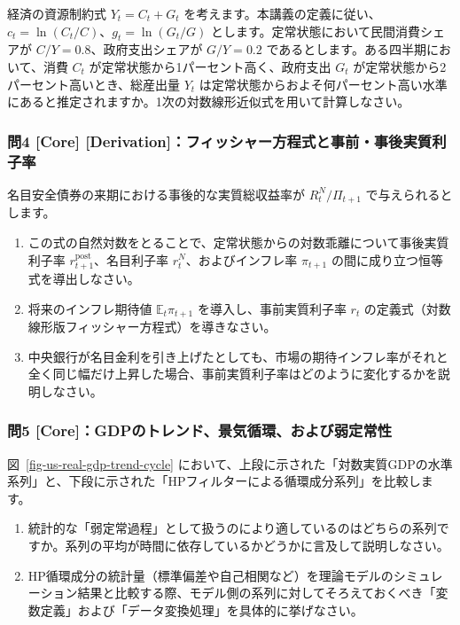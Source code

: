 \documentclass[
  japanese,
  lualatex,
  ja=standard,
  12pt,
  a4paper]{ltjsarticle}
\providecommand{\tightlist}{%
  \setlength{\itemsep}{0pt}\setlength{\parskip}{0pt}}
\begin{document}
経済の資源制約式 \(Y_t=C_t+G_t\)
を考えます。本講義の定義に従い、\(c_t=\ln(C_t/C)\)、\(g_t=\ln(G_t/G)\)
とします。定常状態において民間消費シェアが \(C/Y=0.8\)、政府支出シェアが
\(G/Y=0.2\) であるとします。ある四半期において、消費 \(C_t\)
が定常状態から1パーセント高く、政府支出 \(G_t\)
が定常状態から2パーセント高いとき、総産出量 \(Y_t\)
は定常状態からおよそ何パーセント高い水準にあると推定されますか。1次の対数線形近似式を用いて計算しなさい。

\subsubsection{問4 {[}Core{]}
{[}Derivation{]}：フィッシャー方程式と事前・事後実質利子率}\label{ux554f4-core-derivationux30d5ux30a3ux30c3ux30b7ux30e3ux30fcux65b9ux7a0bux5f0fux3068ux4e8bux524dux4e8bux5f8cux5b9fux8ceaux5229ux5b50ux7387}

名目安全債券の来期における事後的な実質総収益率が \(R_t^N/\Pi_{t+1}\)
で与えられるとします。

\begin{enumerate}
\def\labelenumi{\arabic{enumi}.}
\tightlist
\item
  この式の自然対数をとることで、定常状態からの対数乖離について事後実質利子率
  \(r_{t+1}^{\mathrm{post}}\)、名目利子率 \(r_t^N\)、およびインフレ率
  \(\pi_{t+1}\) の間に成り立つ恒等式を導出しなさい。
\item
  将来のインフレ期待値 \(\mathbb{E}_t\pi_{t+1}\)
  を導入し、事前実質利子率 \(r_t\)
  の定義式（対数線形版フィッシャー方程式）を導きなさい。
\item
  中央銀行が名目金利を引き上げたとしても、市場の期待インフレ率がそれと全く同じ幅だけ上昇した場合、事前実質利子率はどのように変化するかを説明しなさい。
\end{enumerate}


\subsubsection{問5
{[}Core{]}：GDPのトレンド、景気循環、および弱定常性}\label{ux554f5-coregdpux306eux30c8ux30ecux30f3ux30c9ux666fux6c17ux5faaux74b0ux304aux3088ux3073ux5f31ux5b9aux5e38ux6027}

図~\ref{fig-us-real-gdp-trend-cycle}
において、上段に示された「対数実質GDPの水準系列」と、下段に示された「HPフィルターによる循環成分系列」を比較します。

\begin{enumerate}
\def\labelenumi{\arabic{enumi}.}
\tightlist
\item
  統計的な「弱定常過程」として扱うのにより適しているのはどちらの系列ですか。系列の平均が時間に依存しているかどうかに言及して説明しなさい。
\item
  HP循環成分の統計量（標準偏差や自己相関など）を理論モデルのシミュレーション結果と比較する際、モデル側の系列に対してそろえておくべき「変数定義」および「データ変換処理」を具体的に挙げなさい。
\end{enumerate}
\end{document}
